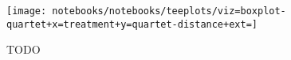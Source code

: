 \begin{figure}
  \centering
  \texttt{[image: notebooks/notebooks/teeplots/viz=boxplot-quartet+x=treatment+y=quartet-distance+ext=]}
  \caption{TODO}
  \label{fig:species-reconstruction-error}
\end{figure}
